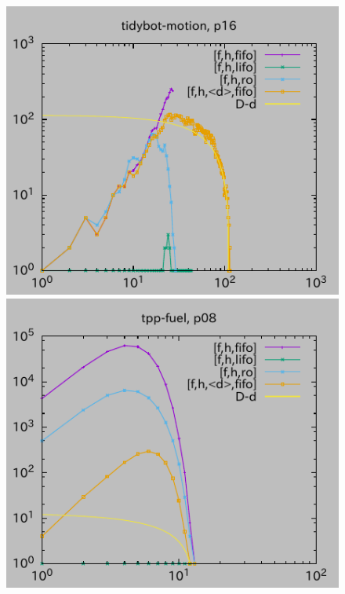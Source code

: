 \begin{figure}[tb]
\includegraphics{img/depth/tidybot-motion/p16.pdf}
\includegraphics{img/depth/tpp-fuel/p08.pdf}

\end{figure}
